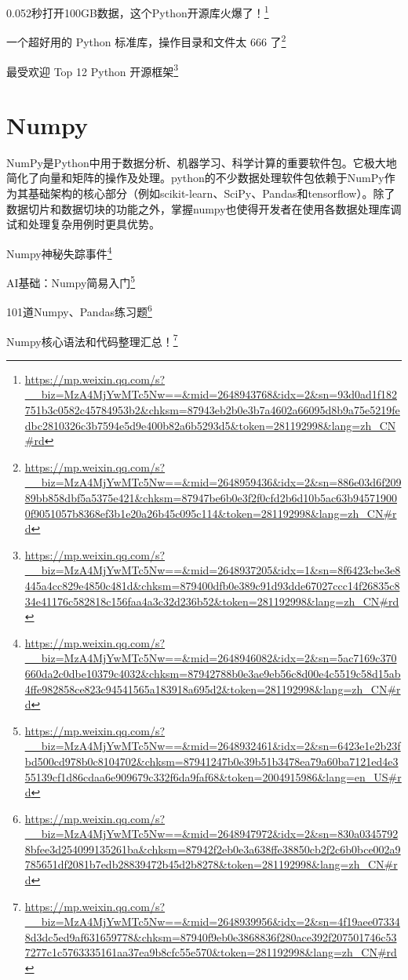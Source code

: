 \documentclass[]{ctexbook}
\renewcommand{\href}[2]{#2\footnote{\url{#1}}}
\begin{document}
\href{https://mp.weixin.qq.com/s?__biz=MzA4MjYwMTc5Nw==\&mid=2648943768\&idx=2\&sn=93d0ad1f182751b3c0582c45784953b2\&chksm=87943eb2b0e3b7a4602a66095d8b9a75e5219fedbc2810326c3b7594e5d9e400b82a6b5293d5\&token=281192998\&lang=zh_CN\#rd}{0.052秒打开100GB数据，这个Python开源库火爆了！}

\href{https://mp.weixin.qq.com/s?__biz=MzA4MjYwMTc5Nw==\&mid=2648959436\&idx=2\&sn=886e03d6f20989bb858dbf5a5375e421\&chksm=87947be6b0e3f2f0cfd2b6d10b5ac63b945719000f9051057b8368ef3b1e20a26b45c095c114\&token=281192998\&lang=zh_CN\#rd}{一个超好用的 Python 标准库，操作目录和文件太 666 了}

\href{https://mp.weixin.qq.com/s?__biz=MzA4MjYwMTc5Nw==\&mid=2648937205\&idx=1\&sn=8f6423cbe3e8445a4cc829e4850c481d\&chksm=879400dfb0e389c91d93dde67027ccc14f26835c834e41176c582818c156faa4a3c32d236b52\&token=281192998\&lang=zh_CN\#rd}{最受欢迎 Top 12 Python 开源框架}

\hypertarget{numpy}{%
\section{Numpy}\label{numpy}}

NumPy是Python中用于数据分析、机器学习、科学计算的重要软件包。它极大地简化了向量和矩阵的操作及处理。python的不少数据处理软件包依赖于NumPy作为其基础架构的核心部分（例如scikit-learn、SciPy、Pandas和tensorflow）。除了数据切片和数据切块的功能之外，掌握numpy也使得开发者在使用各数据处理库调试和处理复杂用例时更具优势。

\href{https://mp.weixin.qq.com/s?__biz=MzA4MjYwMTc5Nw==\&mid=2648946082\&idx=2\&sn=5ac7169c370660da2c0dbe10379c4032\&chksm=87942788b0e3ae9eb56c8d00e4c5519c58d15ab4ffe982858ce823c94541565a183918a695d2\&token=281192998\&lang=zh_CN\#rd}{Numpy神秘失踪事件}

\href{https://mp.weixin.qq.com/s?__biz=MzA4MjYwMTc5Nw==\&mid=2648932461\&idx=2\&sn=6423e1e2b23fbd500cd978b0c8104702\&chksm=87941247b0e39b51b3478ea79a60ba7121ed4e355139cf1d86cdaa6e909679c332f6da9faf68\&token=2004915986\&lang=en_US\#rd}{AI基础：Numpy简易入门}

\href{https://mp.weixin.qq.com/s?__biz=MzA4MjYwMTc5Nw==\&mid=2648947972\&idx=2\&sn=830a03457928bfee3d254099135261ba\&chksm=87942f2eb0e3a638ffe38850cb2f2c6b0bce002a9785651df2081b7edb28839472b45d2b8278\&token=281192998\&lang=zh_CN\#rd}{101道Numpy、Pandas练习题}

\href{https://mp.weixin.qq.com/s?__biz=MzA4MjYwMTc5Nw==\&mid=2648939956\&idx=2\&sn=4f19aee073348d3dc5ed9af631659778\&chksm=87940f9eb0e3868836f280ace392f207501746c537277c1c5763335161aa37ea9b8cfc55e570\&token=281192998\&lang=zh_CN\#rd}{Numpy核心语法和代码整理汇总！}
\end{document}
